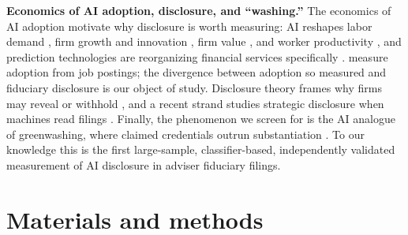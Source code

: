 \documentclass[utf8]{FrontiersinHarvard}
\begin{document}
\textbf{Economics of AI adoption, disclosure, and ``washing.''} The economics of AI adoption motivate why disclosure is worth measuring: AI reshapes labor demand \citep{acemoglu2022}, firm growth and innovation \citep{babina2024}, firm value \citep{eisfeldt2023}, and worker productivity \citep{noy2023,brynjolfsson2025}, and prediction technologies are reorganizing financial services specifically \citep{agrawal2018,dacunto2019}. \citet{babina2024} measure adoption from job postings; the divergence between adoption so measured and fiduciary disclosure is our object of study. Disclosure theory frames why firms may reveal or withhold \citep{verrecchia2001,healy2001,leuz2016,blankespoor2020}, and a recent strand studies strategic disclosure when machines read filings \citep{cao2024}. Finally, the phenomenon we screen for is the AI analogue of greenwashing, where claimed credentials outrun substantiation \citep{delmas2011,lyon2015}. To our knowledge this is the first large-sample, classifier-based, independently validated measurement of AI disclosure in adviser fiduciary filings.

\section{Materials and methods}
\end{document}
